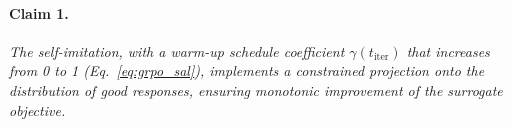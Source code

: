 \documentclass[]{youtu} %
\begin{document}
{%


\paragraph{Claim 1.}\textit{The self-imitation, with a warm-up schedule coefficient $\gamma(t_{\text{iter}})$ that increases from 0 to 1 (Eq.~\ref{eq:grpo_sal}), implements a constrained projection onto the distribution of good responses, ensuring monotonic improvement of the surrogate objective.}

}
\end{document}
